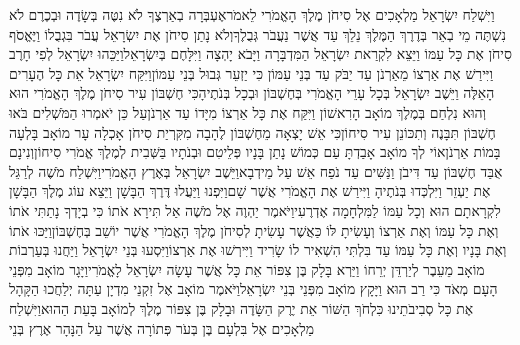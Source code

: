 \documentclass[../main/main.tex]{subfiles}
\begin{document}
\begin{multicols}{\ncols}
וַיִּשְׁלַח יִשְׂרָאֵל מַלְאָכִים אֶל סִיחֹן מֶלֶךְ הָאֱמֹרִי לֵאמֹר\PreVerseSpace{}אֶעְבְּרָה בְאַרְצֶךָ לֹא נִטֶּה בְּשָׂדֶה וּבְכֶרֶם לֹא נִשְׁתֶּה מֵי בְאֵר בְּדֶרֶךְ הַמֶּלֶךְ נֵלֵךְ עַד אֲשֶׁר נַעֲבֹר גְּבֻלֶךָ\PreVerseSpace{}וְלֹא נָתַן סִיחֹן אֶת יִשְׂרָאֵל עֲבֹר בִּגְבֻלוֹ וַיֶּאֱסֹף סִיחֹן אֶת כָּל עַמּוֹ וַיֵּצֵא לִקְרַאת יִשְׂרָאֵל הַמִּדְבָּרָה וַיָּבֹא יָהְצָה וַיִּלָּחֶם בְּיִשְׂרָאֵל\PreVerseSpace{}וַיַּכֵּהוּ יִשְׂרָאֵל לְפִי חָרֶב וַיִּירַשׁ אֶת אַרְצוֹ מֵאַרְנֹן עַד יַבֹּק עַד בְּנֵי עַמּוֹן כִּי יַזְעֵר\SubEnd{} גְּבוּל בְּנֵי עַמּוֹן\PreVerseSpace{}וַיִּקַּח יִשְׂרָאֵל אֵת כָּל הֶעָרִים הָאֵלֶּה וַיֵּשֶׁב יִשְׂרָאֵל בְּכָל עָרֵי הָאֱמֹרִי בְּחֶשְׁבּוֹן וּבְכָל בְּנֹתֶיהָ\PreVerseSpace{}כִּי חֶשְׁבּוֹן עִיר סִיחֹן מֶלֶךְ הָאֱמֹרִי הוּא וְהוּא נִלְחַם בְּמֶלֶךְ מוֹאָב הָרִאשׁוֹן וַיִּקַּח אֶת כָּל אַרְצוֹ מִיָּדוֹ עַד אַרְנֹן\PreVerseSpace{}עַל כֵּן יֹאמְרוּ הַמֹּשְׁלִים בֹּאוּ חֶשְׁבּוֹן תִּבָּנֶה וְתִכּוֹנֵן עִיר סִיחוֹן\PreVerseSpace{}כִּי אֵשׁ יָצְאָה מֵחֶשְׁבּוֹן לֶהָבָה מִקִּרְיַת סִיחֹן אָכְלָה עָר מוֹאָב בָּלְעָה\SubEnd{} בָּמוֹת אַרְנֹן\PreVerseSpace{}אוֹי לְךָ מוֹאָב אָבַדְתָּ עַם כְּמוֹשׁ נָתַן בָּנָיו פְּלֵיטִם וּבְנֹתָיו בַּשְּׁבִית לְמֶלֶךְ אֱמֹרִי סִיחוֹן\PreVerseSpace{}וְנִינָם\SubEnd{} אֻבַּד\SubEnd{} חֶשְׁבּוֹן עַד דִּיבֹן וַנַּשִּׁים עַד נֹפַח אֵשׁ\SubEnd{} עַל\SubEnd{} מֵידְבָא\PreVerseSpace{}וַיֵּשֶׁב יִשְׂרָאֵל בְּאֶרֶץ הָאֱמֹרִי\PreVerseSpace{}וַיִּשְׁלַח מֹשֶׁה לְרַגֵּל אֶת יַעְזֵר וַיִּלְכְּדוּ בְּנֹתֶיהָ וַיִּירַשׁ אֶת הָאֱמֹרִי אֲשֶׁר שָׁם\PreVerseSpace{}וַיִּפְנוּ וַיַּעֲלוּ דֶּרֶךְ הַבָּשָׁן וַיֵּצֵא עוֹג מֶלֶךְ הַבָּשָׁן לִקְרָאתָם הוּא וְכָל עַמּוֹ לַמִּלְחָמָה אֶדְרֶעִי\PreVerseSpace{}וַיֹּאמֶר יַהְוֶה אֶל מֹשֶׁה אַל תִּירָא אֹתוֹ כִּי בְיָדְךָ נָתַתִּי אֹתוֹ וְאֶת כָּל עַמּוֹ וְאֶת אַרְצוֹ וְעָשִׂיתָ לּוֹ כַּאֲשֶׁר עָשִׂיתָ לְסִיחֹן מֶלֶךְ הָאֱמֹרִי אֲשֶׁר יוֹשֵׁב בְּחֶשְׁבּוֹן\PreVerseSpace{}וַיַּכּוּ אֹתוֹ וְאֶת בָּנָיו וְאֶת כָּל עַמּוֹ עַד בִּלְתִּי הִשְׁאִיר לוֹ שָׂרִיד וַיִּירְשׁוּ אֶת אַרְצוֹ\PreChapterSpace{}וַיִּסְעוּ בְּנֵי יִשְׂרָאֵל וַיַּחֲנוּ בְּעַרְבוֹת מוֹאָב מֵעֵבֶר לְיַרְדֵּן יְרֵחוֹ \ClosedSection{}וַיַּרְא בָּלָק בֶּן צִפּוֹר אֵת כָּל אֲשֶׁר עָשָׂה יִשְׂרָאֵל לָאֱמֹרִי\PreVerseSpace{}וַיָּגָר מוֹאָב מִפְּנֵי הָעָם מְאֹד כִּי רַב הוּא וַיָּקָץ מוֹאָב מִפְּנֵי בְּנֵי יִשְׂרָאֵל\PreVerseSpace{}וַיֹּאמֶר מוֹאָב אֶל זִקְנֵי מִדְיָן עַתָּה יְלַחֲכוּ הַקָּהָל אֶת כָּל סְבִיבֹתֵינוּ כִּלְחֹךְ הַשּׁוֹר אֵת יֶרֶק הַשָּׂדֶה וּבָלָק בֶּן צִפּוֹר מֶלֶךְ לְמוֹאָב בָּעֵת הַהוּא\PreVerseSpace{}וַיִּשְׁלַח מַלְאָכִים אֶל בִּלְעָם בֶּן בְּעֹר פְּתוֹרָה אֲשֶׁר עַל הַנָּהָר אֶרֶץ בְּנֵי 
\end{multicols}
\end{document}
